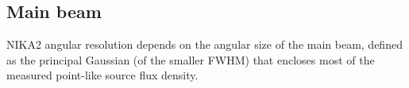 %



\subsection{Main beam}
\label{se:mainbeam}

NIKA2 angular resolution depends on the angular size of the main beam,
defined as the principal Gaussian (of the smaller FWHM) that encloses
most of the measured point-like source flux density.


